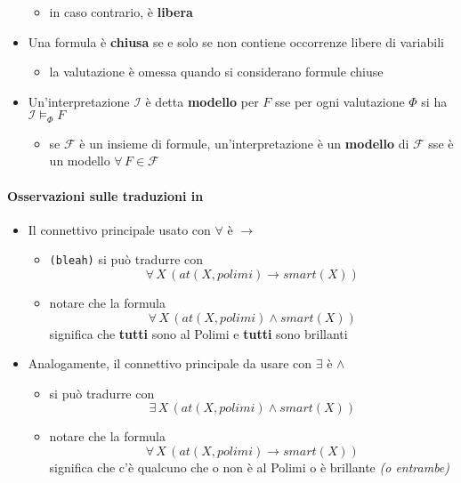 \documentclass[italian, 10pt]{article}
\begin{document}
\begin{itemize}
\begin{itemize}[label=\(\rightarrow\)]
          \item in caso contrario, è \textbf{libera}
        \end{itemize}
  \item Una formula è \textbf{chiusa} se e solo se non contiene occorrenze libere di variabili
        \begin{itemize}
          \item la valutazione è omessa quando si considerano formule chiuse
        \end{itemize}
  \item Un'interpretazione \(\mathcal{I}\) è detta \textbf{modello} per \(F\) sse per ogni valutazione \(\Phi\) si ha \(\mathcal{I} \vDash_\Phi F\)
        \begin{itemize}
          \item se \(\mathcal{F}\) è un insieme di formule, un'interpretazione è un \textbf{modello} di \(\mathcal{F}\) sse è un modello \(\forall \, F \in \mathcal{F}\)
        \end{itemize}
\end{itemize}

\paragraph{Osservazioni sulle traduzioni in \FOL}

\begin{itemize}
  \item Il connettivo principale usato con \(\forall\) è \(\rightarrow\)
        \begin{itemize}
          \item {} \texttt{(bleah)} si può tradurre con \[ \forall \, X \, (at(X, polimi) \rightarrow smart(X)) \]
          \item notare che la formula \[ \forall \, X \, (at(X, polimi) \land smart(X)) \] significa che \textbf{tutti} sono al Polimi e \textbf{tutti} sono brillanti
        \end{itemize}
  \item Analogamente, il connettivo principale da usare con \(\exists\) è \(\land\)
        \begin{itemize}
          \item {} si pu\`o tradurre con \[ \exists \, X \, (at(X, polimi) \land smart(X)) \] %
          \item notare che la formula \[ \forall \, X \, (at(X, polimi) \rightarrow smart(X)) \] significa che c'è qualcuno che o non è al Polimi o è brillante \textit{(o entrambe)}
        \end{itemize}
\end{itemize}
\end{document}
